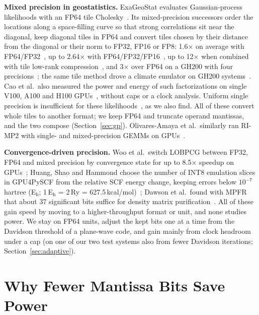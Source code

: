 \documentclass[conference]{IEEEtran}
\begin{document}
\textbf{Mixed precision in geostatistics.} ExaGeoStat evaluates Gaussian-process likelihoods with an FP64 tile
Cholesky~\cite{Abdulah2018}. Its mixed-precision successors order the locations along a space-filling curve so that
strong correlations sit near the diagonal, keep diagonal tiles in FP64 and convert tiles chosen by their distance from
the diagonal or their norm to FP32, FP16 or FP8: 1.6$\times$ on average with FP64/FP32~\cite{Abdulah2019}, up to
2.64$\times$ with FP64/FP32/FP16~\cite{Abdulah2022}, up to 12$\times$ when combined with tile low-rank
compression~\cite{Cao2022}, and 3$\times$ over FP64 on a GH200 with four precisions~\cite{Ren2025}; the same tile method
drove a climate emulator on GH200 systems~\cite{Abdulah2024}. Cao et al.\ also measured the power and energy of such
factorizations on single V100, A100 and H100 GPUs~\cite{Cao2023}, without caps or a clock analysis. Uniform single
precision is insufficient for these likelihoods~\cite{Abdulah2022}, as we also find. All of these convert whole tiles to
another format; we keep FP64 and truncate operand mantissas, and the two compose (Section~\ref{sec:gp}).
Olivares-Amaya et al.\ similarly ran RI-MP2 with single- and mixed-precision GEMMs on GPUs~\cite{OlivaresAmaya2010}.

\textbf{Convergence-driven precision.} Woo et al.\ switch LOBPCG between FP32, FP64 and mixed precision by
convergence state for up to 8.5$\times$ speedup on GPUs~\cite{Woo2023}; Huang, Shao and Hammond choose the number of
INT8 emulation slices in GPU4PySCF from the relative SCF energy change, keeping errors below
$10^{-7}$\,hartree (E$_\mathrm{h}$; 1\,E$_\mathrm{h}$ = 2\,Ry = 627.5\,kcal/mol)~\cite{Huang2026}; Dawson et al.\ found with MPFR that about 37 significant bits suffice for density
matrix purification~\cite{Dawson2024}. All of these gain speed by moving to a higher-throughput format or unit, and
none studies power. We stay on FP64 units, adjust the kept bits one at a time from the Davidson threshold of a
plane-wave code, and gain mainly from clock headroom under a cap (on one of our two test systems also from fewer
Davidson iterations; Section~\ref{sec:adaptive}).


\section{Why Fewer Mantissa Bits Save Power}\label{sec:why}
\end{document}
